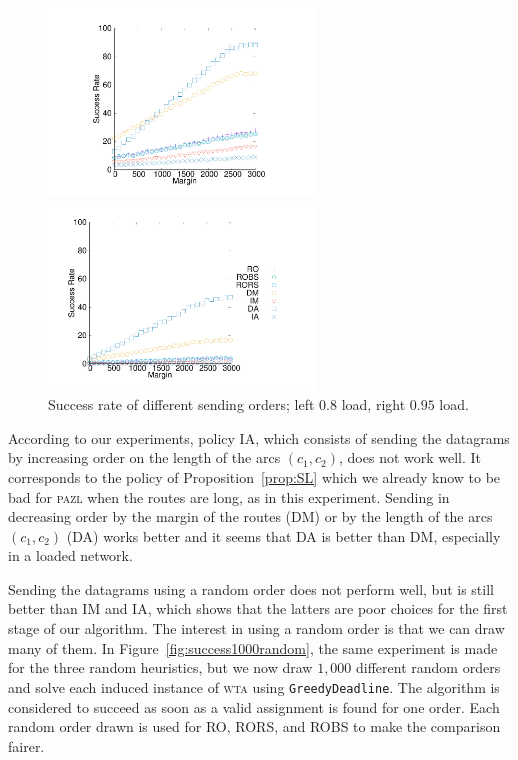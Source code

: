 \documentclass[a4paper,10pt]{journal}
\newcommand\greedydeadline{\texttt{GreedyDeadline}\xspace}
\newcommand\pazl{\textsc{pazl}\xspace}
\newcommand\wta{\textsc{wta}\xspace}
\begin{document}
 
\begin{figure}[h] 
\begin{center} 
  \begin{minipage}[b]{0.45\linewidth}

  \includegraphics[height=5cm]{departs_gp_250001.pdf}
  \end{minipage}
  \begin{minipage}[b]{0.54\linewidth}
  \includegraphics[height=5cm]{departs_gp_210001.pdf}

\end{minipage}
      \caption{Success rate of different sending orders; left $0.8$ load, right $0.95$ load.}
           \label{fig:success1random}
           \end{center}

     \end{figure}

          
  According to our experiments, policy IA, which consists of sending the datagrams by increasing order on the length of the arcs $(c_1,c_2)$, does not work well. It corresponds to the policy of Proposition~\ref{prop:SL} which we already know to be bad for \pazl when the routes are long, as in this experiment. Sending in decreasing order by the margin of the routes (DM) or by the length of the arcs $(c_1,c_2)$ (DA) works better and it seems that DA is better than DM, especially in a loaded network.

Sending the datagrams using a random order does not perform well,
but is still better than IM and IA, which shows that the latters are poor choices for the first stage of our algorithm. The interest in using a random order is that we can draw many of them. In Figure~\ref{fig:success1000random}, the same experiment is made for the three random heuristics, but we now draw $1,000$ different random orders and solve each induced instance of \wta using \greedydeadline. The algorithm is considered to succeed as soon as a valid assignment is found for one order. Each random order drawn is used for RO, RORS, and ROBS to make the comparison fairer.
\end{document}
